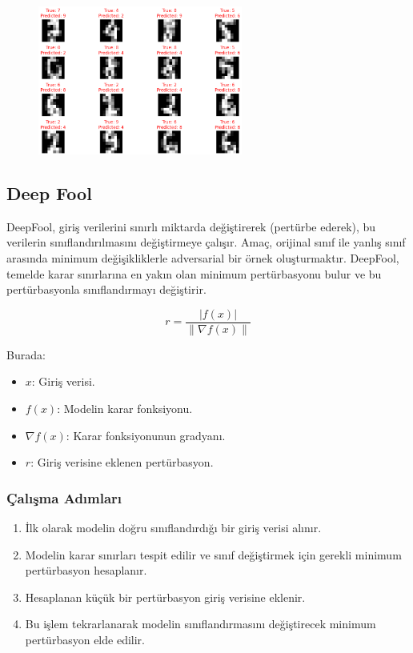 \newpage

\begin{figure}[h]
    \centering
    \includegraphics[width=0.6\textwidth]{images/dt_attack_results.png}
    \caption{}
\end{figure}

\newpage

\subsection{Deep Fool}

DeepFool, giriş verilerini sınırlı miktarda değiştirerek (pertürbe ederek), bu verilerin sınıflandırılmasını değiştirmeye çalışır. Amaç, orijinal sınıf ile yanlış sınıf arasında minimum değişikliklerle adversarial bir örnek oluşturmaktır. DeepFool, temelde karar sınırlarına en yakın olan minimum pertürbasyonu bulur ve bu pertürbasyonla sınıflandırmayı değiştirir.

\[ r = \frac{| f(x) |}{\|\nabla f(x)\|} \]

Burada:

\begin{itemize}
    \item $x$: Giriş verisi.
    \item $f(x)$: Modelin karar fonksiyonu.
    \item $\nabla f(x)$: Karar fonksiyonunun gradyanı.
    \item $r$: Giriş verisine eklenen pertürbasyon.
\end{itemize}

\subsubsection{Çalışma Adımları}

\begin{enumerate}
    \item İlk olarak modelin doğru sınıflandırdığı bir giriş verisi alınır.
    \item Modelin karar sınırları tespit edilir ve sınıf değiştirmek için gerekli minimum pertürbasyon hesaplanır.
    \item Hesaplanan küçük bir pertürbasyon giriş verisine eklenir.
    \item Bu işlem tekrarlanarak modelin sınıflandırmasını değiştirecek minimum pertürbasyon elde edilir.
\end{enumerate}


